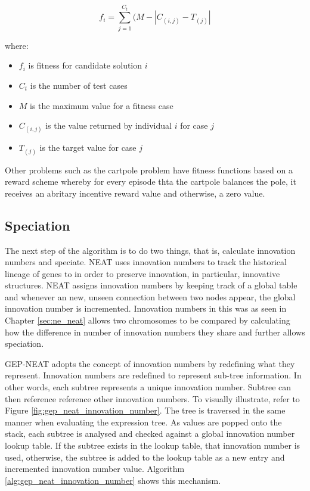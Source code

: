 \begin{equation}\label{alg:absolute_error}
    f_{i} = \sum_{j=1}^{C_t}(M-|C_{(i,j)}-T_{(j)}|
\end{equation}

\noindent where:
\begin{itemize}
    \item $f_i$ is fitness for candidate solution $i$
    \item $C_t$ is the number of test cases
    \item $M$ is the maximum value for a fitness case
    \item $C_{(i,j)}$ is the value returned by individual $i$ for case $j$
    \item $T_{(j)}$ is the target value for case $j$
\end{itemize}

\noindent Other problems such as the cartpole problem have fitness functions based on a reward scheme whereby for every episode thta the cartpole balances the pole, it receives an abritary incentive reward value and otherwise, a zero value.

\subsection{Speciation}
The next step of the algorithm is to do two things, that is, calculate innovation numbers and speciate. NEAT uses innovation numbers to track the historical lineage of genes to in order to preserve innovation, in particular, innovative structures. NEAT assigns innovation numbers by keeping track of a global table and whenever an new, unseen connection between two nodes appear, the global innovation number is incremented. Innovation numbers in this was as seen in Chapter \ref{sec:ne_neat} allows two chromosomes to be compared by calculating how the difference in number of innovation numbers they share and further allows speciation. \bigskip

\noindent GEP-NEAT adopts the concept of innovation numbers by redefining what they represent. Innovation numbers are redefined to represent sub-tree information. In other words, each subtree represents a unique innovation number. Subtree can then reference reference other innovation numbers. To visually illustrate, refer to Figure \ref{fig:gep_neat_innovation_number}. The tree is traversed in the same manner when evaluating the expression tree. As values are popped onto the stack, each subtree is analysed and checked against a global innovation number lookup table. If the subtree exists in the lookup table, that innovation number is used, otherwise, the subtree is added to the lookup table as a new entry and incremented innovation number value. Algorithm \ref{alg:gep_neat_innovation_number} shows this mechanism.

